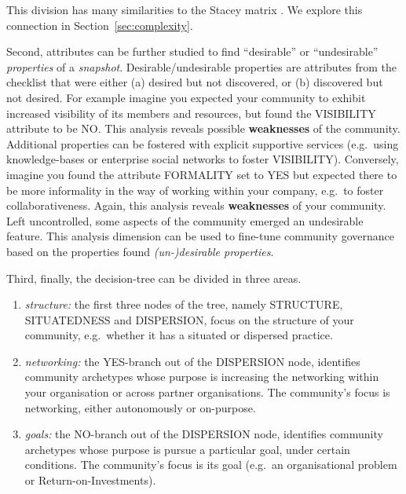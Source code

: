 This division has many similarities to the Stacey matrix \cite{sta02aa}. We explore this connection in Section~\ref{sec:complexity}.

Second, attributes can be further studied to find ``desirable'' or ``undesirable'' \emph{properties} of a \emph{snapshot}. Desirable/undesirable properties are attributes from the checklist that were either (a) desired but not discovered, or (b) discovered but not desired. For example imagine you expected your community to exhibit increased visibility of its members and resources, but found the VISIBILITY attribute to be NO. This analysis reveals possible \textbf{weaknesses} of the community. Additional properties can be fostered with explicit supportive services (e.g.~using knowledge-bases or enterprise social networks to foster VISIBILITY). Conversely, imagine you found the attribute FORMALITY set to YES but expected there to be more informality in the way of working within your company, e.g.~to foster collaborativeness. Again, this analysis reveals \textbf{weaknesses} of your community. Left uncontrolled, some aspects of the community emerged an undesirable feature. This analysis dimension can be used to fine-tune community governance based on the properties found \emph{\mbox{(un-)desirable} properties}.

Third, finally, the decision-tree can be divided in three areas. 

\begin{enumerate} 
\item \emph{structure:} the first three nodes of the tree, namely STRUCTURE, SITUATEDNESS and DISPERSION, focus on the structure of your community, e.g.~whether it has a situated or dispersed practice.
\item \emph{networking:} the YES-branch out of the DISPERSION node, identifies community archetypes whose purpose is increasing the networking within your organisation or across partner organisations. The community's focus is networking, either autonomously or on-purpose.
\item \emph{goals:} the NO-branch out of the DISPERSION node, identifies community archetypes whose purpose is pursue a particular goal, under certain conditions. The community's focus is its goal (e.g.~an organisational problem or Return-on-Investments).
\end{enumerate}

